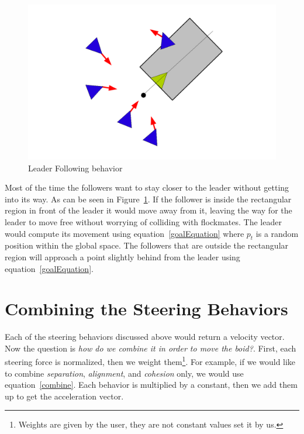 \begin{figure}[htbp]
\begin{center}
\includegraphics[scale=0.5]{figures/leaderFollowing.pdf}
\caption{Leader Following behavior}
\label{leaderPDF}
\end{center}
\end{figure}

Most of the time the followers want to stay closer to the leader without getting into its way. As can be seen in Figure~\ref{leaderPDF}.  If the follower is inside the rectangular region in front of the leader it would move away from it, leaving the way for the leader to move free without worrying of colliding with flockmates. The leader would compute its movement using equation~\ref{goalEquation} where $p_t$ is a random position within the global space. The followers that are outside the rectangular region will approach a point slightly behind from the leader using equation~\ref{goalEquation}.

\section{Combining the Steering Behaviors}
Each of the steering behaviors discussed above would return a velocity vector. Now the question is \textit{how do we combine it in order to move the boid?}. First, each steering force is normalized, then we weight them\footnote{Weights are given by the user, they are not constant values set it by us.}. For example, if we would like to combine \textit{separation}, \textit{alignment}, and \textit{cohesion} only, we would use equation~\ref{combine}. Each behavior is multiplied by a constant, then we add them up to get the acceleration vector.

